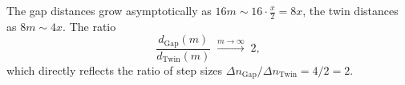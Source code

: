 \begin{bemerkung}
The gap distances grow asymptotically as $16m \sim 16\cdot\frac{x}{2} = 8x$,
the twin distances as $8m \sim 4x$. The ratio
\[
  \frac{d_{\mathrm{Gap}}(m)}{d_{\mathrm{Twin}}(m)}
  \;\xrightarrow{m\to\infty}\; 2,
\]
which directly reflects the ratio of step sizes $\Delta n_{\mathrm{Gap}} /
\Delta n_{\mathrm{Twin}} = 4/2 = 2$.
\end{bemerkung}
